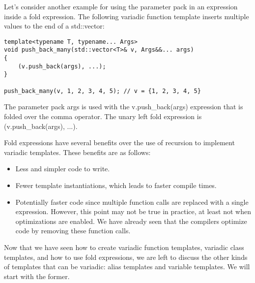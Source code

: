 Let's consider another example for using the parameter pack in an expression inside a fold expression. The following variadic function template inserts multiple values to the end of a std::vector:

\begin{lstlisting}[style=styleCXX]
template<typename T, typename... Args>
void push_back_many(std::vector<T>& v, Args&&... args)
{
	(v.push_back(args), ...);
}

push_back_many(v, 1, 2, 3, 4, 5); // v = {1, 2, 3, 4, 5}
\end{lstlisting}

The parameter pack args is used with the v.push\_back(args) expression that is folded over the comma operator. The unary left fold expression is (v.push\_back(args), ...).

Fold expressions have several benefits over the use of recursion to implement variadic templates. These benefits are as follows:

\begin{itemize}
\item
Less and simpler code to write.

\item
Fewer template instantiations, which leads to faster compile times.

\item
Potentially faster code since multiple function calls are replaced with a single expression. However, this point may not be true in practice, at least not when optimizations are enabled. We have already seen that the compilers optimize code by removing these function calls.
\end{itemize}

Now that we have seen how to create variadic function templates, variadic class templates, and how to use fold expressions, we are left to discuss the other kinds of templates that can be variadic: alias templates and variable templates. We will start with the former.




















